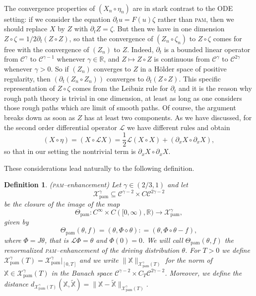 \documentclass[a4paper,11pt]{article}
\newcommand{\tmname}[1]{\textsc{#1}}
\newcommand{\tmop}[1]{\ensuremath{\operatorname{#1}}}
\newtheorem{definition}{Definition}
{\theorembodyfont{\rmfamily}\newtheorem{example}{Example}}
{\theorembodyfont{\rmfamily\small\it}\newtheorem{exercise}{Exercise}}
\newcommand{\LL}{\mathscr{L}}
\newcommand{\CC}{\mathscr{C}}
\newcommand{\R}{\mathbb{R}}
\newcommand{\reso}{\,\mathord{\circ}\,}
\newcommand{\renorm}{\,\mathord{\diamond}\,}
\begin{document}
\

\begin{remark}
  The convergence properties of $(X_n \reso \eta_n)$ are in stark contrast to the ODE setting: if we consider the equation $\partial_t u = F (u) \zeta$  rather than {\tmname{pam}}, then we should replace $X$ by $Z$ with $\partial_t Z = \zeta$. But then we have in one dimension $Z \reso \zeta = 1/ 2 \partial_t (Z \reso Z)$, so that the convergence of $(Z_n \reso \zeta_n)$ to $Z \reso \zeta$ comes for free with the convergence of $(Z_n)$ to $Z$. Indeed, $\partial_t$ is a bounded linear operator from $\CC^\gamma$ to $\CC^{\gamma-1}$ whenever $\gamma \in \R$, and $Z \mapsto Z \circ Z$ is continuous from $\CC^\gamma$ to $\CC^{2\gamma}$ whenever $\gamma > 0$. So if $(Z_n)$ converges to $Z$ in a H\"older space of positive regularity, then $(\partial_t (Z_n \circ Z_n))$ converges to $\partial_t (Z \circ Z)$. This specific representation of $Z \reso \zeta$ comes from the Leibniz rule for $\partial_t$ and it is the reason why rough path theory is trivial in one dimension, at least as long as one considers those rough paths which are limit of smooth paths. Of course, the argument breaks down as soon as $Z$ has at least two components. As we have discussed, for the second order differential operator $\LL$ we have different rules and obtain
  \[ (X \reso \eta) = (X \reso \LL X) = \frac{1}{2}  \LL (X \reso X) +
     (\partial_x X \reso \partial_x X), \]
  so that in our setting the nontrivial term is $\partial_x X \reso \partial_x X$.
\end{remark}

These considerations lead naturally to the following definition.

\begin{definition}
  \label{def:pam rough distribution}({\tmname{pam}}--enhancement) Let $\gamma
  \in (2 / 3, 1)$ and let
  \[ \mathcal{X}_{\tmop{pam}}^\gamma \subseteq \CC^{\gamma - 2} \times C \CC^{2
     \gamma - 2} \]
  be the closure of the image of the map
  \[ \Theta_{\tmop{pam}} : C^{\infty} \times C ([0, \infty), \mathbb{R})
     \rightarrow \mathcal{X}_{\tmop{pam}}^\gamma, \]
  given by
  \begin{equation}
    \Theta_{\tmop{pam}} (\theta, f) = (\theta, \Phi \renorm \theta) : =
    (\theta, \Phi \reso \theta - f), \label{eq:enhanced-pam}
  \end{equation}
  where $\Phi = J \theta$, that is $\LL \Phi = \theta$ and $\Phi (0) = 0$. We
  will call $\Theta_{\tmop{pam}} (\theta, f)$ the renormalized
  {\tmname{pam}}--enhancement of the driving distribution $\theta$. For $T >
  0$ we define $\mathcal{X}_{\tmop{pam}}^\gamma (T) = \mathcal{X}_{\tmop{pam}}^\gamma |_{[0,
  T]}$ and we write $\| \mathbb{X} \|_{\mathcal{X}_{\tmop{pam}}^\gamma (T)}$ for the
  norm of $\mathbb{X} \in \mathcal{X}_{\tmop{pam}}^\gamma (T)$ in the Banach space
  $\CC^{\gamma - 2} \times C_T \CC^{2 \gamma - 2}$. Moreover, we define the
  distance $d_{\mathcal{X}_{\tmop{pam}}^\gamma (T)} (\mathbb{X},
  \tilde{\mathbb{X}}) = \|\mathbb{X}- \tilde{\mathbb{X}}
  \|_{\mathcal{X}_{\tmop{pam}}^\gamma (T)}$.
\end{definition}
\end{document}
